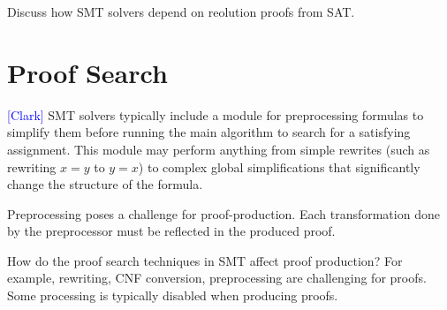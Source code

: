 \documentclass{llncs}
\newcommand{\Note}[1]{\textcolor{blue}{[#1]}}
\begin{document}

Discuss how SMT solvers depend on reolution proofs from SAT.






\section{Proof Search}

\Note{Clark}
SMT solvers typically include a module for preprocessing formulas to simplify
them before running the main algorithm to search for a satisfying assignment.
This module may perform anything from simple rewrites (such as rewriting $x=y$
to $y=x$) to complex global simplifications that significantly change the
structure of the formula.

Preprocessing poses a challenge for proof-production.  Each transformation done
by the preprocessor must be reflected in the produced proof.

How do the proof search techniques in SMT affect proof production?  For
example, rewriting, CNF conversion, preprocessing are challenging for proofs.
Some processing is typically disabled when producing proofs.



\end{document}
